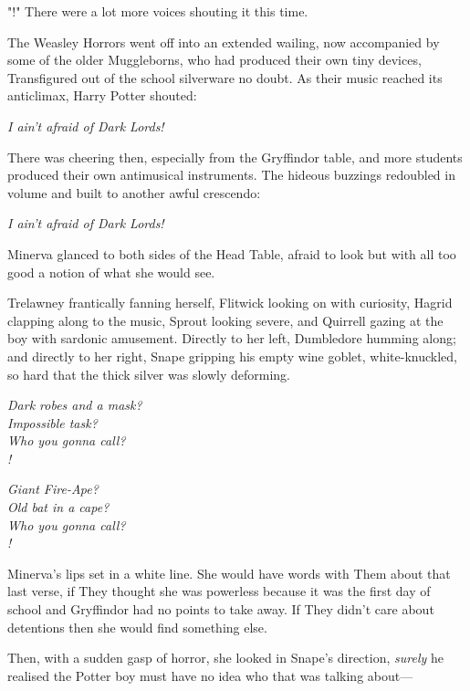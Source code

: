 "!" There were a lot more voices shouting it this time.

The Weasley Horrors went off into an extended wailing, now accompanied by some 
of the older Muggleborns, who had produced their own tiny devices, Transfigured 
out of the school silverware no doubt. As their music reached its anticlimax, 
Harry Potter shouted:

\begin{center}
\emph{I ain't afraid of Dark Lords!}
\end{center}

There was cheering then, especially from the Gryffindor table, and more 
students produced their own antimusical instruments. The hideous buzzings 
redoubled in volume and built to another awful crescendo:

\begin{center}
\emph{I ain't afraid of Dark Lords!}
\end{center}

Minerva glanced to both sides of the Head Table, afraid to look but with all 
too good a notion of what she would see.

Trelawney frantically fanning herself, Flitwick looking on with curiosity, 
Hagrid clapping along to the music, Sprout looking severe, and Quirrell gazing 
at the boy with sardonic amusement. Directly to her left, Dumbledore humming 
along; and directly to her right, Snape gripping his empty wine goblet, 
white-knuckled, so hard that the thick silver was slowly deforming.

\begin{center}
\emph{Dark robes and a mask?\\
Impossible task?\\
Who you gonna call?\\
!}

\emph{Giant Fire-Ape?\\
Old bat in a cape?\\
Who you gonna call?\\
!}
\end{center}

Minerva's lips set in a white line. She would have words with Them about that 
last verse, if They thought she was powerless because it was the first day of 
school and Gryffindor had no points to take away. If They didn't care about 
detentions then she would find something else.

Then, with a sudden gasp of horror, she looked in Snape's direction, 
\emph{surely} he realised the Potter boy must have no idea who that was talking 
about---

